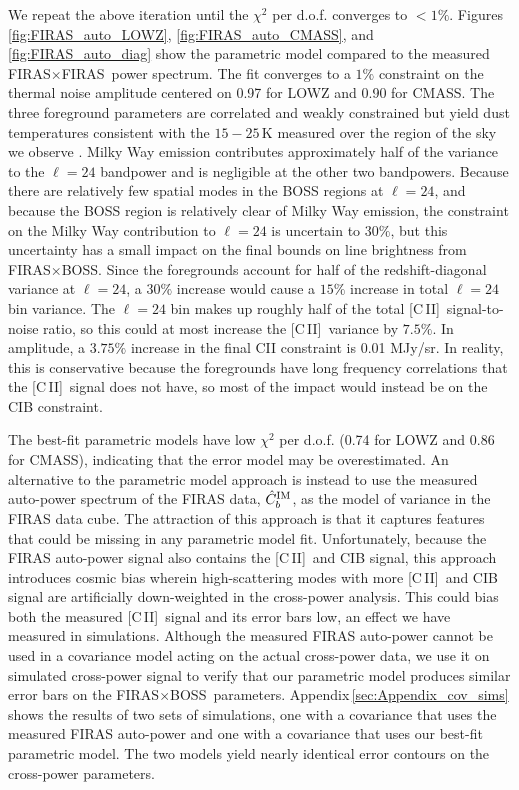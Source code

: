\documentclass[fleqn,usenatbib]{mnras}
\newcommand{\cii}{[C{\sc\,II}]}
\newcommand{\FF}{FIRAS${\times}$FIRAS}
\newcommand{\FB}{FIRAS${\times}$BOSS}
\begin{document}
We repeat the above iteration until the $\chi^2$ per d.o.f. converges to ${<}1\%$. Figures \ref{fig:FIRAS_auto_LOWZ}, \ref{fig:FIRAS_auto_CMASS}, and \ref{fig:FIRAS_auto_diag} show the parametric model compared to the measured \FF\ power spectrum. The fit converges to a $1\%$ constraint on the thermal noise amplitude centered on 0.97 for LOWZ and 0.90 for CMASS. The three foreground parameters are correlated and weakly constrained but yield dust temperatures consistent with the $15-25$\,K measured over the region of the sky we observe \citep{PhysRevD.95.103517}. Milky Way emission contributes approximately half of the variance to the $\ell=24$ bandpower and is negligible at the other two bandpowers. Because there are relatively few spatial modes in the BOSS regions at $\ell=24$, and because the BOSS region is relatively clear of Milky Way emission, the constraint on the Milky Way contribution to $\ell=24$ is uncertain to $30\%$, but this uncertainty has a small impact on the final bounds on line brightness from \FB. Since the foregrounds account for half of the redshift-diagonal variance at $\ell=24$, a $30\%$ increase would cause a $15\%$ increase in total $\ell=24$ bin variance. The $\ell=24$ bin makes up roughly half of the total \cii\ signal-to-noise ratio, so this could at most increase the \cii\ variance by $7.5\%$. In amplitude, a $3.75\%$ increase in the final CII constraint is 0.01 MJy/sr. In reality, this is conservative because the foregrounds have long frequency correlations that the \cii\ signal does not have, so most of the impact would instead be on the CIB constraint.

The best-fit parametric models have low $\chi^2$ per d.o.f. (0.74 for LOWZ and 0.86 for CMASS), indicating that the error model may be overestimated. An alternative to the parametric model approach is instead to use the measured auto-power spectrum of the FIRAS data, $\hat{C}_b^{\rm IM}$, as the model of variance in the FIRAS data cube. The attraction of this approach is that it captures features that could be missing in any parametric model fit. Unfortunately, because the FIRAS auto-power signal also contains the \cii\ and CIB signal, this approach introduces cosmic bias wherein high-scattering modes with more \cii\ and CIB signal are artificially down-weighted in the cross-power analysis. This could bias both the measured \cii\ signal and its error bars low, an effect we have measured in simulations.
Although the measured FIRAS auto-power cannot be used in a covariance model acting on the actual cross-power data, we use it on simulated cross-power signal to verify that our parametric model produces similar error bars on the \FB\ parameters. Appendix\,\ref{sec:Appendix_cov_sims} shows the results of two sets of simulations, one with a covariance that uses the measured FIRAS auto-power and one with a covariance that uses our best-fit parametric model. The two models yield nearly identical error contours on the cross-power parameters.
 
\end{document}
